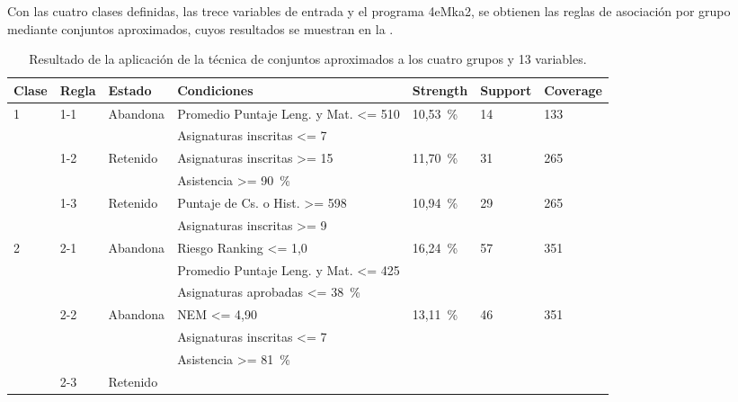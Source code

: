 \documentclass[portuguese]{textolivre}
\begin{document}
Con las cuatro clases definidas, las trece variables de entrada y el programa 4eMka2, se obtienen las reglas de asociación por grupo mediante conjuntos aproximados, cuyos resultados se muestran en la .

\begin{table}[htbp]
    \caption{Resultado de la aplicación de la técnica de conjuntos aproximados a los cuatro grupos y 13 variables.}
    \label{Tabla 8}
    \centering
    \begin{tabular}{lllp{5cm}lll}
    \toprule
    Clase & Regla & Estado & Condiciones & Strength & Support & Coverage\\
    \midrule
    \multirow{6}{*}{1} &
    \multirow{2}{*}{1-1} &
    \multirow{2}{*}{Abandona}
     & Promedio Puntaje Leng. y Mat. <= 510 &
    \multirow{2}{*}{10,53~\%} &
    \multirow{2}{*}{14} &
    \multirow{2}{*}{133}\\
    & & & Asignaturas inscritas <= 7 & & &\\
    \cmidrule{2-7}
    & \multirow{2}{*}{1-2} &
    \multirow{2}{*}{Retenido}
     & Asignaturas inscritas >= 15 &
    \multirow{2}{*}{11,70~\%} &
    \multirow{2}{*}{31} &
    \multirow{2}{*}{265}\\
    & & & Asistencia >= 90~\% & & &\\
    \cmidrule{2-7}
    & \multirow{2}{*}{1-3} &
    \multirow{2}{*}{Retenido}
     & Puntaje de Cs. o Hist. >= 598 &
    \multirow{2}{*}{10,94~\%} &
    \multirow{2}{*}{29} &
    \multirow{2}{*}{265}\\
    & & & Asignaturas inscritas >= 9 & & &\\
    \cmidrule{1-7}
    \multirow{9}{*}{2} &
    \multirow{3}{*}{2-1} &
    \multirow{3}{*}{Abandona}
     & Riesgo Ranking <= 1,0 &
    \multirow{3}{*}{16,24~\%} &
    \multirow{3}{*}{57} &
    \multirow{3}{*}{351}\\
    & & & Promedio Puntaje Leng. y Mat. <= 425 & & &\\
    & & & Asignaturas aprobadas <= 38~\% & & &\\
    \cmidrule{2-7}
    & \multirow{3}{*}{2-2} &
    \multirow{3}{*}{Abandona}
     & NEM <= 4,90 &
    \multirow{3}{*}{13,11~\%} &
    \multirow{3}{*}{46} &
    \multirow{3}{*}{351}\\
    & & & Asignaturas inscritas <= 7 & & &\\
    & & & Asistencia >= 81~\% & & &\\
    \cmidrule{2-7}
    & \multirow{3}{*}{2-3} &
    \multirow{3}{*}{Retenido}

\end{tabular}
\end{table}
\end{document}
